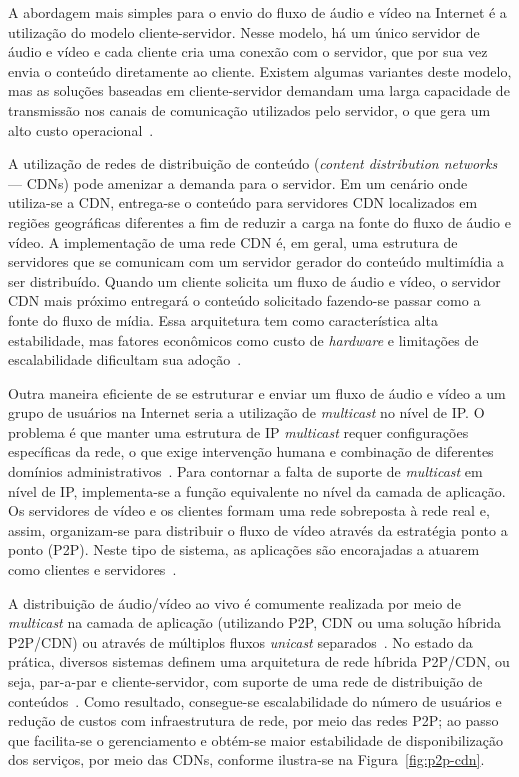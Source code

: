 A abordagem mais simples para o envio do fluxo de áudio e vídeo na Internet é a utilização do modelo cliente-servidor. Nesse modelo, há um único servidor de áudio e vídeo e cada cliente cria uma conexão com o servidor, que por sua vez envia o conteúdo diretamente ao cliente.
Existem algumas variantes deste modelo, mas as soluções baseadas em cliente-servidor demandam uma larga capacidade de transmissão nos canais de comunicação utilizados pelo servidor, o que gera um alto custo operacional~\cite{liu2008survey}. 

A utilização de redes de distribuição de conteúdo (\textit{content distribution networks} — CDNs) pode amenizar a demanda para o servidor. Em um cenário onde utiliza-se a CDN, entrega-se o conteúdo para servidores CDN localizados em regiões geográficas diferentes a fim de reduzir a carga na fonte do fluxo de áudio e vídeo.
A implementação de uma rede CDN é, em geral, uma estrutura de servidores que se comunicam com um servidor gerador do conteúdo multimídia a ser distribuído.
Quando um cliente solicita um fluxo de áudio e vídeo, o servidor CDN mais próximo entregará o conteúdo solicitado fazendo-se passar como a fonte do fluxo de mídia. Essa arquitetura tem como característica alta estabilidade, mas fatores econômicos como custo de \textit{hardware} e limitações de escalabilidade dificultam sua adoção~\cite{meskovic2012content}.

Outra maneira eficiente de se estruturar e enviar um fluxo de áudio e vídeo a um grupo de usuários na Internet seria a utilização de \textit{multicast} no nível de IP. O problema é que manter uma estrutura de IP \textit{multicast} requer configurações específicas da rede, o que exige intervenção humana e combinação de diferentes domínios administrativos~\cite{sales2014gmtp, liu2008survey}. 
Para contornar a falta de suporte de \textit{multicast} em nível de IP, implementa-se a função equivalente no nível da camada de aplicação. 
Os servidores de vídeo e os clientes formam uma rede sobreposta à rede real e, assim, organizam-se para distribuir o fluxo de vídeo através da estratégia ponto a ponto (P2P). Neste tipo de sistema, as aplicações são encorajadas a atuarem como clientes e servidores~\cite{sales2014gmtp}.

A distribuição de áudio/vídeo ao vivo é comumente realizada por meio de \textit{multicast} na camada de aplicação (utilizando P2P, CDN ou uma solução híbrida P2P/CDN) ou através de múltiplos fluxos \textit{unicast} separados~\cite{kurose2010redes}. 
No estado da prática, diversos sistemas definem uma arquitetura de rede híbrida P2P/CDN, ou seja, par-a-par e cliente-servidor, com suporte de uma rede de distribuição de conteúdos~\cite{meskovic2012content}. Como resultado, consegue-se escalabilidade do número de usuários e redução de custos com infraestrutura de rede, por meio das redes P2P; ao passo que facilita-se o gerenciamento e obtém-se maior estabilidade de disponibilização dos serviços, por meio das CDNs, conforme ilustra-se na Figura~\ref{fig:p2p-cdn}.


